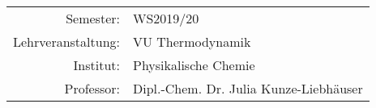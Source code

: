   
\maketitle %
  
\begin{center}
  \begin{tabular}{r p{4cm}}
    Semester: & WS2019/20 \\
    Lehrveranstaltung: & VU Thermodynamik \\
    Institut: & Physikalische Chemie \\
    Professor: & Dipl.-Chem. Dr. Julia Kunze-Liebhäuser %
  \end{tabular}
\end{center}


\tableofcontents